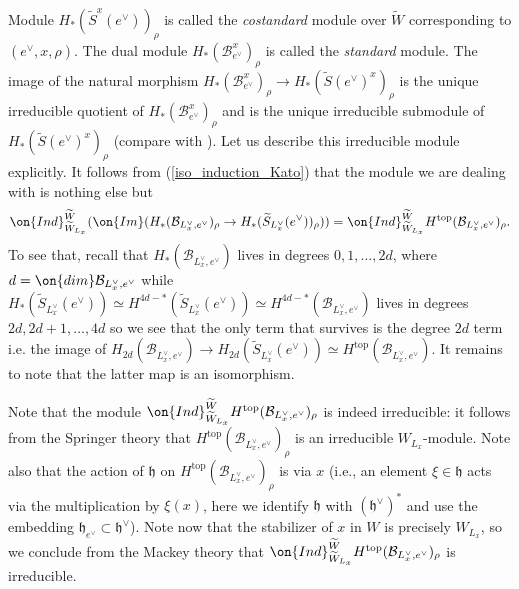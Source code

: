 \documentclass[12pt]{amsart}
\begin{document}
Module  $H_*(\widetilde{S}^{x}(e^\vee))_{\rho}$ is called the {\emph{costandard}} module over $\widetilde{W}$ corresponding to $(e^\vee,x,\rho)$. The dual module $H_*(\mathcal{B}_{e^\vee}^{x})_{\rho}$ is called the {\emph{standard}} module. The image of the natural morphism $H_*(\mathcal{B}_{e^\vee}^{x})_{\rho} \rightarrow H_*(\widetilde{S}(e^\vee)^x)_{\rho}$ is the unique irreducible quotient of  $H_*(\mathcal{B}_{e^\vee}^{x})_{\rho}$ and is the unique irreducible submodule of $H_*(\widetilde{S}(e^\vee)^{x})_{\rho}$ (compare with \cite[Theorem 8.1.13]{Chriss-Ginzburg}).
Let us describe this irreducible module explicitly. It follows from (\ref{iso_induction_Kato}) that the module we are dealing with is nothing else but 
\begin{equation*}
\on{Ind}_{\widetilde{W}_{L_x}}^{\widetilde{W}}(\on{Im}(H_*(\mathcal{B}_{L_x^\vee,e^\vee})_{\rho} \rightarrow H_*(\widetilde{S}_{L_x^\vee}(e^\vee))_{\rho}))=\on{Ind}_{\widetilde{W}_{L_x}}^{\widetilde{W}}H^{\mathrm{top}}(\mathcal{B}_{L_x^\vee,e^\vee})_{\rho}.
\end{equation*}
To see that, recall that $H_{*}(\mathcal{B}_{L_x^\vee,e^\vee})$ lives in degrees $0,1,\ldots,2d$, where $d=\on{dim}\mathcal{B}_{L_x^\vee,e^\vee}$ while $H_{*}(\widetilde{S}_{L_x^\vee}(e^\vee))\simeq H^{4d-*}(\widetilde{S}_{L_x^\vee}(e^\vee))\simeq H^{4d-*}(\mathcal{B}_{L_x^\vee,e^\vee})$ lives in degrees $2d,2d+1,\ldots,4d$ so we see that the only term that survives is the degree $2d$ term i.e. the image of $H_{2d}(\mathcal{B}_{L_x^\vee,e^\vee}) \rightarrow H_{2d}(\widetilde{S}_{L_x^\vee}(e^\vee))\simeq H^{\mathrm{top}}(\mathcal{B}_{L_x^\vee,e^\vee})$. It remains to note that the latter map is an isomorphism.


\begin{rmk}
Note that the module $\on{Ind}_{\widetilde{W}_{L_x}}^{\widetilde{W}}H^{\mathrm{top}}(\mathcal{B}_{L_x^\vee,e^\vee})_{\rho}$ is indeed irreducible: it follows from the Springer theory that     $H^{\mathrm{top}}(\mathcal{B}_{L_x^\vee,e^\vee})_{\rho}$ is an irreducible $W_{L_x}$-module. Note also that the action of $\mathfrak{h}$ on $H^{\mathrm{top}}(\mathcal{B}_{L_x^\vee,e^\vee})_{\rho}$ is via $x$ (i.e., an element $\xi \in \mathfrak{h}$ acts via the multiplication by $\xi(x)$, here we identify $\mathfrak{h}$ with $(\mathfrak{h}^\vee)^*$ and use the embedding $\mathfrak{h}_{e^\vee} \subset \mathfrak{h}^{\vee}$). Note now that the stabilizer of $x$ in $W$ is precisely $W_{L_x}$, so we conclude from the Mackey theory that $\on{Ind}_{\widetilde{W}_{L_x}}^{\widetilde{W}}H^{\mathrm{top}}(\mathcal{B}_{L_x^\vee,e^\vee})_{\rho}$ is irreducible.
\end{rmk}
\end{document}
